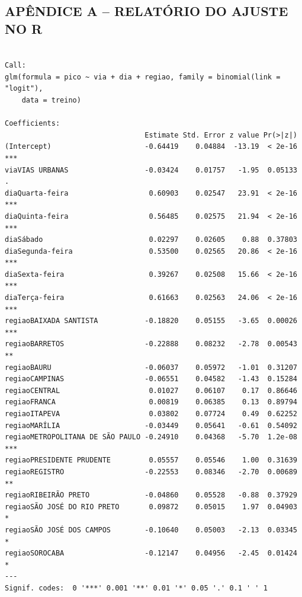 \documentclass[
  article,
  12pt,
  oneside,
  a4paper,
  section=TITLE,
  english,
  brazil
]{abntex2}\usepackage[]{graphicx}\usepackage[]{xcolor}
\makeatletter
\newenvironment{kframe}{%
 \def\at@end@of@kframe{}%
 \ifinner\ifhmode%
  \def\at@end@of@kframe{\end{minipage}}%
  \begin{minipage}{\columnwidth}%
 \fi\fi%
 \def\FrameCommand##1{\hskip\@totalleftmargin \hskip-\fboxsep
 \colorbox{shadecolor}{##1}\hskip-\fboxsep
     \hskip-\linewidth \hskip-\@totalleftmargin \hskip\columnwidth}%
 \MakeFramed {\advance\hsize-\width
   \@totalleftmargin\z@ \linewidth\hsize
   \@setminipage}}%
 {\par\unskip\endMakeFramed%
 \at@end@of@kframe}
\newenvironment{knitrout}{}{} %
\makeatother
\begin{document}
\clearpage
\appendix
\begin{SingleSpace}
\section*{APÊNDICE A -- RELATÓRIO DO AJUSTE NO R}
\begin{flushleft}\fontsize{7.2}{8.4}\selectfont
\begin{knitrout}
\color{fgcolor}\begin{kframe}
\begin{verbatim}

Call:
glm(formula = pico ~ via + dia + regiao, family = binomial(link = "logit"),
    data = treino)

Coefficients:
                                 Estimate Std. Error z value Pr(>|z|)
(Intercept)                      -0.64419    0.04884  -13.19  < 2e-16 ***
viaVIAS URBANAS                  -0.03424    0.01757   -1.95  0.05133 .
diaQuarta-feira                   0.60903    0.02547   23.91  < 2e-16 ***
diaQuinta-feira                   0.56485    0.02575   21.94  < 2e-16 ***
diaSábado                         0.02297    0.02605    0.88  0.37803
diaSegunda-feira                  0.53500    0.02565   20.86  < 2e-16 ***
diaSexta-feira                    0.39267    0.02508   15.66  < 2e-16 ***
diaTerça-feira                    0.61663    0.02563   24.06  < 2e-16 ***
regiaoBAIXADA SANTISTA           -0.18820    0.05155   -3.65  0.00026 ***
regiaoBARRETOS                   -0.22888    0.08232   -2.78  0.00543 **
regiaoBAURU                      -0.06037    0.05972   -1.01  0.31207
regiaoCAMPINAS                   -0.06551    0.04582   -1.43  0.15284
regiaoCENTRAL                     0.01027    0.06107    0.17  0.86646
regiaoFRANCA                      0.00819    0.06385    0.13  0.89794
regiaoITAPEVA                     0.03802    0.07724    0.49  0.62252
regiaoMARÍLIA                    -0.03449    0.05641   -0.61  0.54092
regiaoMETROPOLITANA DE SÃO PAULO -0.24910    0.04368   -5.70  1.2e-08 ***
regiaoPRESIDENTE PRUDENTE         0.05557    0.05546    1.00  0.31639
regiaoREGISTRO                   -0.22553    0.08346   -2.70  0.00689 **
regiaoRIBEIRÃO PRETO             -0.04860    0.05528   -0.88  0.37929
regiaoSÃO JOSÉ DO RIO PRETO       0.09872    0.05015    1.97  0.04903 *
regiaoSÃO JOSÉ DOS CAMPOS        -0.10640    0.05003   -2.13  0.03345 *
regiaoSOROCABA                   -0.12147    0.04956   -2.45  0.01424 *
---
Signif. codes:  0 '***' 0.001 '**' 0.01 '*' 0.05 '.' 0.1 ' ' 1


\end{verbatim}
\end{kframe}
\end{knitrout}
\end{flushleft}
\end{SingleSpace}
\end{document}
